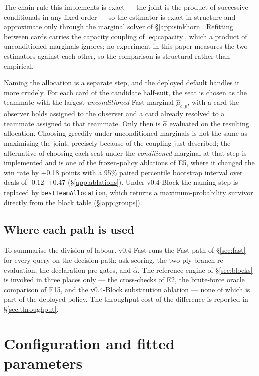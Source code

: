 \documentclass[11pt]{article}
\theoremstyle{definition}
\DeclareRobustCommand{\vfast}{\texorpdfstring{\mbox{v0.4-Fast}}{v0.4-Fast}}
\DeclareRobustCommand{\vblock}{\texorpdfstring{\mbox{v0.4-Block}}{v0.4-Block}}
\newcommand{\numAblGmap}{+0.18}
\newcommand{\numAblGmapCI}{-0.12--+0.47}
\begin{document}
The chain rule this implements is exact --- the joint is the product of
successive conditionals in any fixed order --- so the estimator is exact in
structure and approximate only through the marginal solver of
\S\ref{app:sinkhorn}. Refitting between cards carries the capacity coupling of
\eqref{eq:capacity}, which a product of unconditioned marginals ignores; no
experiment in this paper measures the two estimators against each other, so the
comparison is structural rather than empirical.

Naming the allocation is a separate step, and the deployed default handles it
more crudely. For each card of the candidate half-suit, the seat is chosen as the
teammate with the largest \emph{unconditioned} Fast marginal $\hat\mu_{c,p}$,
with a card the observer holds assigned to the observer and a card already
resolved to a teammate assigned to that teammate. Only then is $\hat\alpha$
evaluated on the resulting allocation. Choosing greedily under unconditioned
marginals is not the same as maximising the joint, precisely because of the
coupling just described; the alternative of choosing each seat under the
\emph{conditioned} marginal at that step is implemented and is one of the
frozen-policy ablations of E5, where it changed the win rate by \numAblGmap{}
points with a 95\% paired percentile bootstrap interval over deals of
\numAblGmapCI{} (\S\ref{app:ablations}). Under
\vblock{} the naming step is replaced by \texttt{bestTeamAllocation}, which
returns a maximum-probability survivor directly from the block table
(\S\ref{app:groups}).

\subsection{Where each path is used}
\label{app:paths}

To summarise the division of labour. \vfast{} runs the Fast path of
\S\ref{sec:fast} for every query on the decision path: ask scoring, the two-ply
branch re-evaluation, the declaration pre-gates, and $\hat\alpha$. The reference
engine of \S\ref{sec:blocks} is invoked in three places only --- the cross-checks
of E2, the brute-force oracle comparison of E15, and the \vblock{} substitution
ablation --- none of which is part of the deployed policy. The throughput cost of
the difference is reported in \S\ref{sec:throughput}.
\section{Configuration and fitted parameters}
\label{app:params}
\end{document}
